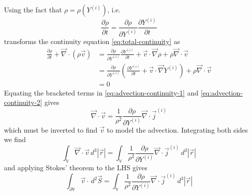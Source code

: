 \documentclass[12pt]{report}
\begin{document}
Using the fact that $\rho = \rho(Y^{(i)})$, i.e.\
\begin{equation*}
  \frac{\partial \rho}{\partial t} =
  \frac{\partial \rho}{\partial Y^{(i)}} \frac{\partial Y^{(i)}}{\partial t}
\end{equation*}
transforms the continuity equation \eqref{eq:total-continuity} as
\begin{equation}\label{eq:advection-continuity-2}
  \begin{aligned}
    \frac{\partial \rho}{\partial t} +
    \vec{\nabla} \cdot (\rho \vec{v})
    &=
    \frac{\partial \rho}{\partial Y^{(i)}} \frac{\partial Y^{(i)}}{\partial t} +
    \vec{v} \cdot \vec{\nabla} \rho +
    \rho \vec{\nabla} \cdot \vec{v} \\
    &=
    \frac{\partial \rho}{\partial Y^{(i)}}
    \left(
    \frac{\partial Y^{(i)}}{\partial t} +
    \vec{v} \cdot \vec{\nabla} Y^{(i)}
    \right) +
    \rho \vec{\nabla} \cdot \vec{v} \\
    &= 0
  \end{aligned}
\end{equation}
Equating the bracketed terms in \eqref{eq:advection-continuity-1} and \eqref{eq:advection-continuity-2} gives
\begin{equation}
  \vec{\nabla} \cdot \vec{v}
  =
  \frac{1}{\rho^2}
  \frac{\partial \rho}{\partial Y^{(i)}}
  \vec{\nabla} \cdot \vec{j}^{(i)}
\end{equation}
which must be inverted to find $\vec{v}$ to model the advection.
Integrating both sides we find
\begin{equation*}
  \int_{\mathbb{V}}
  \vec{\nabla} \cdot \vec{v}
  \, d^3|\vec{r}|
  =
  \int_{\mathbb{V}}
  \frac{1}{\rho^2}
  \frac{\partial \rho}{\partial Y^{(i)}}
  \vec{\nabla} \cdot \vec{j}^{(i)}
  \, d^3|\vec{r}|
\end{equation*}
and applying Stokes' theorem to the LHS gives
\begin{equation*}
  \int_{\partial \mathbb{V}}
  \vec{v} \cdot
  \, d^2\vec{S}
  =
  \int_{\mathbb{V}}
  \frac{1}{\rho^2}
  \frac{\partial \rho}{\partial Y^{(i)}}
  \vec{\nabla} \cdot \vec{j}^{(i)}
  \, d^3|\vec{r}|
\end{equation*}
\end{document}
